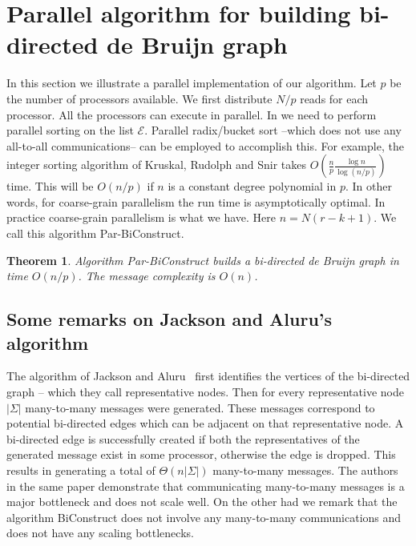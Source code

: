 \documentclass[11pt,conference,twocolumn]{IEEEtran}
\newtheorem{theorem}{Theorem}
\begin{document}
\section{Parallel algorithm for building bi-directed de Bruijn graph}
\label{sec:parallel}
In this section we illustrate a parallel implementation of our algorithm.
Let $p$ be the number of processors available. We first distribute $N/p$ reads for each processor. All 
the processors can execute {\sf [STEP-1]} in parallel. In {\sf [STEP-2]} we need to perform 
parallel sorting on the list $\mathcal{E}$. Parallel radix/bucket sort --which does not use 
any all-to-all communications-- can be employed to accomplish this. For example, the integer sorting algorithm of
Kruskal, Rudolph and Snir takes $O\left (\frac{n}{p}\frac{\log n}{\log(n/p)}\right )$ time. This will be $O(n/p)$ if $n$ is
a constant degree polynomial in $p$. In other words, for coarse-grain parallelism the run time is asymptotically
optimal. In practice coarse-grain parallelism is what we have. Here $n = N(r-k+1)$.
We call this algorithm {\sf Par-BiConstruct}. 

\begin{theorem}
Algorithm {\sf Par-BiConstruct} builds a bi-directed de Bruijn graph in time $O(n/p)$. The message complexity is
$O(n)$.
\end{theorem}

\subsection{Some remarks on Jackson and Aluru's algorithm}
\label{sec:remarks}
The algorithm of Jackson and Aluru~\cite{par_bidirected_graph}  first identifies the vertices of the bi-directed
graph -- which they call representative nodes. Then for every representative node $|\Sigma|$ 
many-to-many messages were generated. These messages correspond to potential bi-directed edges
which can be adjacent on that representative node. A bi-directed edge is successfully created
if both the representatives of the generated message exist in some processor, otherwise the
edge is dropped. This results in generating a total of $\Theta(n|\Sigma|)$ many-to-many messages.
The authors in the same paper demonstrate that communicating many-to-many messages is a major 
bottleneck and does not scale well. On the other had we remark that the algorithm {\sf BiConstruct}
does not involve any many-to-many communications and does not have any scaling bottlenecks. 
\end{document}
